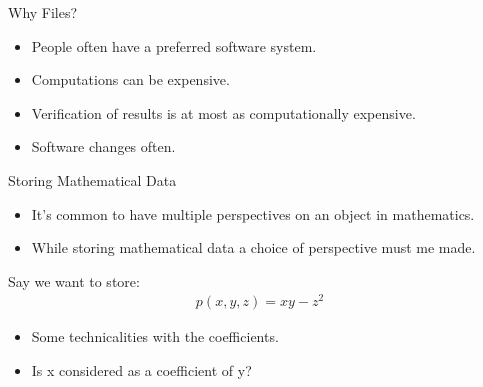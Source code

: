 \documentclass[9pt]{beamer}
\theoremstyle{definition}
\begin{document}


\begin{frame}[fragile]{Why Files?}
  \begin{itemize}
  \item People often have a preferred software system. \pause
  \item Computations can be expensive. \pause
  \item Verification of results is at most as computationally expensive.\pause
  \item Software changes often. 
  \end{itemize}
\end{frame}


\begin{frame}[fragile]{Storing Mathematical Data}
  \begin{itemize}
    \item It's common to have multiple perspectives on an object in mathematics. \pause
    \item While storing mathematical data a choice of perspective must me made. \pause
    \end{itemize}

  Say we want to store:
  \begin{align*}
    p(x, y, z) = xy - z^2
  \end{align*} \pause

  \begin{itemize}
  \item Some technicalities with the coefficients.
  \item Is x considered as a coefficient of y?
  \end{itemize}
\end{frame}

\end{document}

